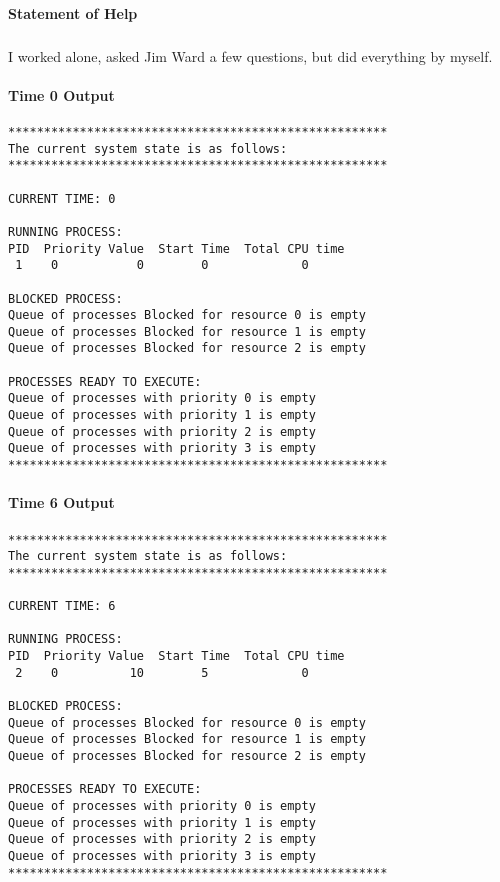 \paragraph*{Statement of Help}
\subparagraph*{}
I worked alone, asked Jim Ward a few questions, but did everything by myself.

\paragraph*{Time 0 Output}
\indent \fontsize{10}{9.7}\selectfont \begin{verbatim}
*****************************************************
The current system state is as follows:
*****************************************************

CURRENT TIME: 0

RUNNING PROCESS:
PID  Priority Value  Start Time  Total CPU time
 1    0           0        0             0

BLOCKED PROCESS:
Queue of processes Blocked for resource 0 is empty
Queue of processes Blocked for resource 1 is empty
Queue of processes Blocked for resource 2 is empty

PROCESSES READY TO EXECUTE:
Queue of processes with priority 0 is empty
Queue of processes with priority 1 is empty
Queue of processes with priority 2 is empty
Queue of processes with priority 3 is empty
*****************************************************
\end{verbatim}

\paragraph*{Time 6 Output}
\indent \fontsize{10}{9.7}\selectfont \begin{verbatim}
*****************************************************
The current system state is as follows:
*****************************************************

CURRENT TIME: 6

RUNNING PROCESS:
PID  Priority Value  Start Time  Total CPU time
 2    0          10        5             0

BLOCKED PROCESS:
Queue of processes Blocked for resource 0 is empty
Queue of processes Blocked for resource 1 is empty
Queue of processes Blocked for resource 2 is empty

PROCESSES READY TO EXECUTE:
Queue of processes with priority 0 is empty
Queue of processes with priority 1 is empty
Queue of processes with priority 2 is empty
Queue of processes with priority 3 is empty
*****************************************************
\end{verbatim}
\newpage
